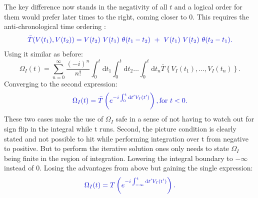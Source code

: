 \documentclass[12pt, titlepage]{article}
\begin{document}
The key difference now stands in the negativity of all $ t $ and a logical order for them would prefer later times to the right, coming closer to $ 0 $. This requires the anti-chronological time ordering :
 \begin{equation}\label{eq:anti-chron-time_ordering}
\textcolor[RGB]{0,0,204}{
\bar{T}(V(t_1), V(t_2))=V(t_2)\ V(t_1)\ \theta (t_1 -t_2)\ +\ V(t_1)\  V(t_2) \ \theta (t_2-t_1)
.}
\end{equation}
Using it similar as before:
\begin{equation}
\Omega_{I}(t) =
\sum\limits_{n=0}^{\infty} 
\frac{(-i)^{n}}{n!}
\int_{0}^{t}\mathrm{d}t_1\int_{0}^{t}\! \! \mathrm{d}t_2
 \ldots
 \int_{0}^{t}\! \! \mathrm{d}t_n
 \bar{T}\left\lbrace V_{I}(t_1), \ldots , V_{I}(t_n)\right\rbrace .
\end{equation}
Converging to the second expression:
\begin{equation}\label{eq:Omega_I_Chron_0<}
\textcolor[RGB]{0,0,204}{
\Omega_{I}(t)
= \bar{T}\left( e^{-i\int_{0}^{t}\mathrm{d}t^{\prime} V_{I}(t^{\prime})} \right)
	,\text{for  }  t<0 
	.}
\end{equation}
These two cases make the use of $ \Omega_I $ safe in a sense of not having to watch out for sign flip in the integral while t runs. Second, the picture condition is clearly stated and not possible to hit while performing integration over t from negative to positive. But to perform the iterative solution ones only needs to state $ \Omega_{I} $ being finite in the region of integration. Lowering the integral boundary  to $ -\infty $ instead of $ 0 $. Losing the advantages from above but gaining the single expression:
\begin{equation}\label{eq:Omega_I_Chron_infty}
\textcolor[RGB]{0,0,204}{
\Omega_{I}(t)
=T\left( e^{-i\int_{-\infty}^{t}\mathrm{d}t^{\prime} V_{I}(t^{\prime})} \right)
	.}
\end{equation}
\end{document}
